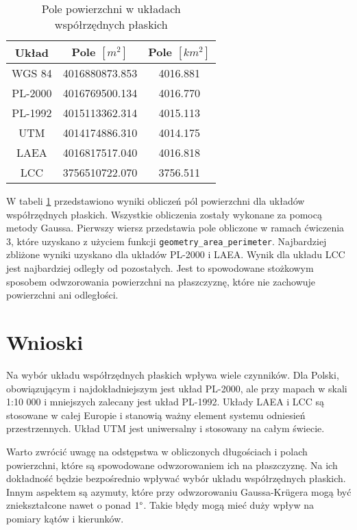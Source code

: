\documentclass[fleqn,10pt,a4paper]{article}
\begin{document}
\begin{table}[!ht]
  \centering
  \begin{tabular}{|c|c|c|}
    \hline
    Układ & Pole $[m^2]$ & Pole $[km^2]$\\
    \hline
    WGS 84 & 4016880873.853 & 4016.881 \\
    PL-2000 & 4016769500.134 & 4016.770 \\
    PL-1992 & 4015113362.314 & 4015.113 \\
    UTM & 4014174886.310 & 4014.175 \\
    LAEA & 4016817517.040 & 4016.818 \\
    LCC & 3756510722.070 & 3756.511 \\
    \hline
  \end{tabular}
  \caption{Pole powierzchni w układach współrzędnych płaskich}
  \label{tab:area_epsg}
\end{table}

W tabeli \ref{tab:area_epsg} przedstawiono wyniki obliczeń pól powierzchni dla układów współrzędnych płaskich.
Wszystkie obliczenia zostały wykonane za pomocą metody Gaussa. Pierwszy wiersz przedstawia pole obliczone w ramach ćwiczenia 3,
które uzyskano z użyciem funkcji \texttt{geometry\_area\_perimeter}.
Najbardziej zbliżone wyniki uzyskano dla układów PL-2000 i LAEA.
Wynik dla układu LCC jest najbardziej odległy od pozostałych. Jest to spowodowane stożkowym sposobem odwzorowania
powierzchni na płaszczyznę, które nie zachowuje powierzchni ani odległości.

\section{Wnioski}
Na wybór układu współrzędnych płaskich wpływa wiele czynników.
Dla Polski, obowiązującym i najdokładniejszym jest układ PL-2000, ale przy mapach w skali 1:10 000 i mniejszych zalecany jest układ PL-1992.
Układy LAEA i LCC są stosowane w całej Europie i stanowią ważny element systemu odniesień przestrzennych.
Układ UTM jest uniwersalny i stosowany na całym świecie. 

Warto zwrócić uwagę na odstępstwa w obliczonych długościach i polach powierzchni, które są spowodowane odwzorowaniem 
ich na płaszczyznę. Na ich dokładność będzie bezpośrednio wpływać wybór układu współrzędnych płaskich.
Innym aspektem są azymuty, które przy odwzorowaniu Gaussa-Krügera mogą być zniekształcone nawet o ponad $1 \degree$.
Takie błędy mogą mieć duży wpływ na pomiary kątów i kierunków.
\end{document}
